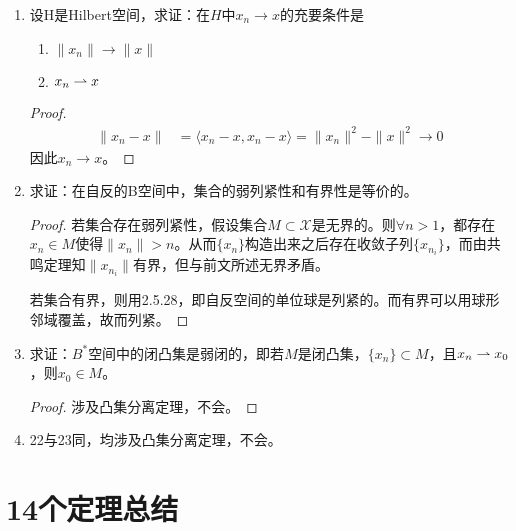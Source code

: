 \begin{enumerate}[leftmargin=2cm, label=\arabic*]
		\item 设H是Hilbert空间，求证：在$H$中$x_n\to x$的充要条件是
		\begin{enumerate}[leftmargin=1cm, label=(\arabic*)]
			\item $\|x_n\| \to \|x\|$
			\item $x_n\rightharpoonup x$
		\end{enumerate}
		\begin{proof}
			\begin{align*}
				\|x_n - x\| &= \langle x_n - x, x_n - x\rangle = \|x_n\|^2 - \|x\|^2 \to 0
			\end{align*}
			因此$x_n\to x$。
		\end{proof}
		
		\item 求证：在自反的B空间中，集合的弱列紧性和有界性是等价的。
		\begin{proof}
			若集合存在弱列紧性，假设集合$M\subset\mathscr{X}$是无界的。则$\forall n>1$，都存在$x_n\in M$使得$\|x_n\| > n$。从而$\{x_n\}$构造出来之后存在收敛子列$\{x_{n_i}\}$，而由共鸣定理知$\|x_{n_i}\|$有界，但与前文所述无界矛盾。
			
			若集合有界，则用2.5.28，即自反空间的单位球是列紧的。而有界可以用球形邻域覆盖，故而列紧。
		\end{proof}
		
		\item 求证：$B^*$空间中的闭凸集是弱闭的，即若$M$是闭凸集，$\{x_n\}\subset M$，且$x_n\rightharpoonup x_0$，则$x_0\in M$。
		\begin{proof}
			涉及凸集分离定理，不会。
		\end{proof}
		
		\item 22与23同，均涉及凸集分离定理，不会。
	\end{enumerate}
	
	
	
	
	
	\chapter{14个定理总结}
